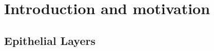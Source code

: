 \documentclass[11pt, final, a4paper, twoside, openright]{book}
\begin{document}
	\InitializeThesis
	
	 
	
	
	
	\frontmatter
	
	
	
	
	
	
	\mainmatter
	\part{Introduction and motivation}\label{part_1}
	
%	


	\renewcommand{\thesection}{1.\arabic{section}}
	\hypertarget{epithelial-layers}{%
	\chapter{Epithelial Layers}\label{epithelial-layers}}
	
\end{document}
